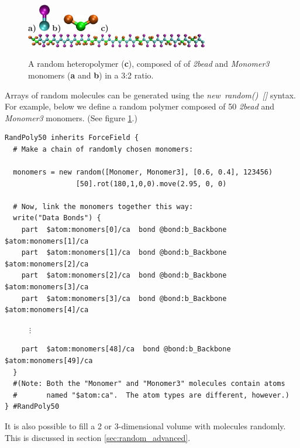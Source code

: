 \documentclass[11pt]{article}
\begin{document}
\begin{figure}[htbp]
\centering
\textbf{a)}
\includegraphics[height=1.2cm]{random_2bead.jpg}
\hspace{0.2cm}
\textbf{b)}
\includegraphics[height=0.75cm]{random_3bead.jpg}
\hspace{0.2cm}
\textbf{c)}
\includegraphics[width=8cm]{random_heteropolymer.jpg}
\caption{
\label{fig:random_heteropolymer}
A random heteropolymer (\textbf{c}),
composed of of \textit{2bead} and \textit{Monomer3} monomers
(\textbf{a} and \textbf{b}) in a 3:2 ratio.
}
\end{figure}
Arrays of random molecules can be generated using the 
\mbox{\textit{new random() []}} syntax.  For example,
below we define a random polymer composed of 50 
\textit{2bead} and \textit{Monomer3} monomers.
(See figure \ref{fig:random_heteropolymer}.)
\begin{verbatim}
RandPoly50 inherits ForceField {
  # Make a chain of randomly chosen monomers:

  monomers = new random([Monomer, Monomer3], [0.6, 0.4], 123456)
                 [50].rot(180,1,0,0).move(2.95, 0, 0)

  # Now, link the monomers together this way:
  write("Data Bonds") {
    part  $atom:monomers[0]/ca  bond @bond:b_Backbone  $atom:monomers[1]/ca
    part  $atom:monomers[1]/ca  bond @bond:b_Backbone  $atom:monomers[2]/ca
    part  $atom:monomers[2]/ca  bond @bond:b_Backbone  $atom:monomers[3]/ca
    part  $atom:monomers[3]/ca  bond @bond:b_Backbone  $atom:monomers[4]/ca
\end{verbatim}
$\quad \quad \quad \vdots $
\begin{verbatim}
    part  $atom:monomers[48]/ca  bond @bond:b_Backbone  $atom:monomers[49]/ca
  }
  #(Note: Both the "Monomer" and "Monomer3" molecules contain atoms
  #       named "$atom:ca".  The atom types are different, however.)
} #RandPoly50
\end{verbatim}
It is also possible to fill a 2 or 3-dimensional volume with
molecules randomly.  This is discussed in section
\ref{sec:random_advanced}.
\end{document}
